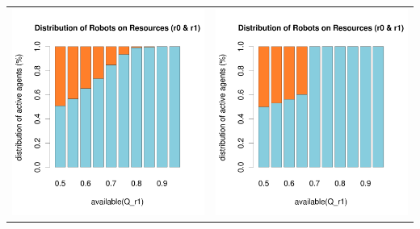 \documentclass[a4paper,10pt]{article}
\begin{document}
\begin{table}[H]
\begin{tabular}{cc}
\includegraphics[width=\imgSize]{../images/5StaticEnv/barplotAliveR1AndR2_mean_env3_normalized}& \includegraphics[width=\imgSize]{../images/5StaticEnv/barplotAliveR1AndR2_median_env3_normalized}
\end{tabular}

\end{table}
\end{document}
